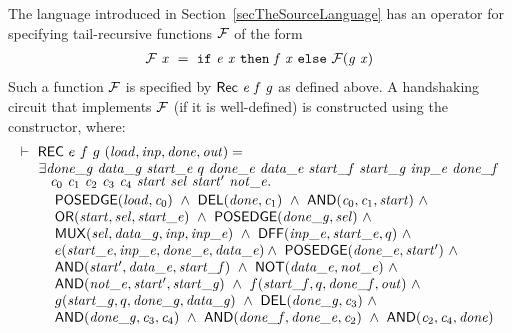 The language introduced in Section~\ref{secTheSourceLanguage} 
has an operator  for specifying tail-recursive functions ${\cal{F}}$
of the form
\[
\begin{array}{l}
\mathit{{\cal{F}}}\ \mathit{x} ~=~ \texttt{if}~\mathit{e}\ \mathit{x}~\texttt{then}~\mathit{f}\ \mathit{x}~\texttt{else}~\mathit{{\cal{F}}}(\mathit{g}\  \mathit{x})
\end{array}
\]
Such a function ${\cal{F}}$ is specified by $\mathsf{Rec}~\mathit{e}~\mathit{f}~\mathit{g}$ as defined
above. A handshaking circuit that implements ${\cal{F}}$ (if it is well-defined) is
constructed using the  constructor, where:
\[
\begin{array}{l}
\TURNST\ \DEF{REC}\ e\ f\ g\ (\VAR{load,inp,done,out}) = \\
\phantom{\TURNST\ ~}
     \exists \VAR{done\_g}~ \VAR{data\_g}~ \VAR{start\_e}~ q~ \VAR{done\_e}~ 
             \VAR{data\_e}~ \VAR{start\_f}~ \VAR{start\_g}~ \VAR{inp\_e}~ 
             \VAR{done\_f}\\[-1mm]
\phantom{\TURNST\ ~\exists }
             \sVAR{c}{0}~ \sVAR{c}{1}~ 
             \sVAR{c}{2}~ \sVAR{c}{3}~\sVAR{c}{4}~
             \VAR{start}~ \VAR{sel}~ \VAR{start'}~ \VAR{not\_e}. \\[0.5mm]
\phantom{\TURNST\ ~\exists~ }
        \DEF{POSEDGE}(\VAR{load},\sVAR{c}{0})\ \AND\
        \DEF{DEL}(\VAR{done},\sVAR{c}{1})\ \AND\
        \DEF{AND}(\sVAR{c}{0},\sVAR{c}{1},\VAR{start})\ \AND \\
\phantom{\TURNST\ ~\exists~ }
        \DEF{OR}(\VAR{start,sel,start\_e})\ \AND\
        \DEF{POSEDGE}(\VAR{done\_g,sel})\ \AND \\
\phantom{\TURNST\ ~\exists~ }
        \DEF{MUX}(\VAR{sel,data\_g,inp,inp\_e})\ \AND\
           \DEF{DFF}(\VAR{inp\_e},\VAR{start\_e},q)\ \AND \\
\phantom{\TURNST\ ~\exists~ }
           e (\VAR{start\_e},\VAR{inp\_e},\VAR{done\_e},\VAR{data\_e}) \AND\
        \DEF{POSEDGE}(\VAR{done\_e,start'})\ \AND \\
\phantom{\TURNST\ ~\exists~ }
        \DEF{AND}(\VAR{start',data\_e,start\_f})\ \AND\
        \DEF{NOT}(\VAR{data\_e,not\_e})\ \AND \\
\phantom{\TURNST\ ~\exists~ }
        \DEF{AND}(\VAR{not\_e,start',start\_g})\ \AND\
           f (\VAR{start\_f},q,\VAR{done\_f},\VAR{out})\ \AND\\
\phantom{\TURNST\ ~\exists~ }
           g (\VAR{start\_g},q,\VAR{done\_g},\VAR{data\_g})\ \AND\
        \DEF{DEL}(\VAR{done\_g},\sVAR{c}{3})\ \AND\\
\phantom{\TURNST\ ~\exists~ }
        \DEF{AND}(\VAR{done\_g},\sVAR{c}{3},\sVAR{c}{4})\ \AND\
        \DEF{AND}(\VAR{done\_f},\VAR{done\_e},\sVAR{c}{2})\ \AND\
        \DEF{AND}(\sVAR{c}{2},\sVAR{c}{4},\VAR{done})
\end{array}
\]
